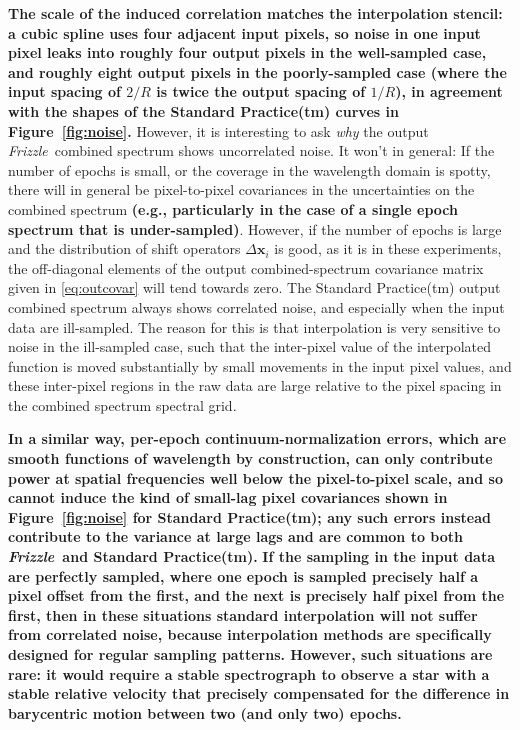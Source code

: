 \documentclass[modern, linenumbers]{aastex631}
\newcommand{\name}{\textsl{Frizzle}}
\newcommand{\modified}[1]{\textcolor{Emerald}{\textbf{#1}}}
\begin{document}
\modified{The scale of the induced correlation matches the interpolation stencil: a cubic spline uses four adjacent input pixels, so noise in one input pixel leaks into roughly four output pixels in the well-sampled case, and roughly eight output pixels in the poorly-sampled case (where the input spacing of $2/R$ is twice the output spacing of $1/R$), in agreement with the shapes of the Standard Practice(tm) curves in Figure~\ref{fig:noise}.}
However, it is interesting to ask \emph{why} the output \name\ combined spectrum shows uncorrelated noise.
It won't in general: If the number of epochs is small, or the coverage in the wavelength domain is spotty, there will in general be pixel-to-pixel covariances in the uncertainties on the combined spectrum \modified{(e.g., particularly in the case of a single epoch spectrum that is under-sampled)}.
However, if the number of epochs is large and the distribution of shift operators \modified{$\Delta\mathbf{x}_i$} is good, as it is in these experiments, the off-diagonal elements of the output combined-spectrum covariance matrix given in \eqref{eq:outcovar} will tend towards zero.
The Standard Practice(tm) output combined spectrum always shows correlated noise, and especially when the input data are ill-sampled.
The reason for this is that interpolation is very sensitive to noise in the ill-sampled case, such that the inter-pixel value of the interpolated function is moved substantially by small movements in the input pixel values, and these inter-pixel regions in the raw data are large relative to the pixel spacing in the combined spectrum spectral grid.

\modified{In a similar way, per-epoch continuum-normalization errors, which are smooth functions of wavelength by construction, can only contribute power at spatial frequencies well below the pixel-to-pixel scale, and so cannot induce the kind of small-lag pixel covariances shown in Figure~\ref{fig:noise} for Standard Practice(tm); any such errors instead contribute to the variance at large lags and are common to both \name\ and Standard Practice(tm).}
\modified{If the sampling in the input data are perfectly sampled, where one epoch is sampled precisely half a pixel offset from the first, and the next is precisely half pixel from the first, then in these situations standard interpolation will not suffer from correlated noise, because interpolation methods are specifically designed for regular sampling patterns. However, such situations are rare: it would require a stable spectrograph to observe a star with a stable relative velocity that precisely compensated for the difference in barycentric motion between two (and only two) epochs.}
\end{document}

